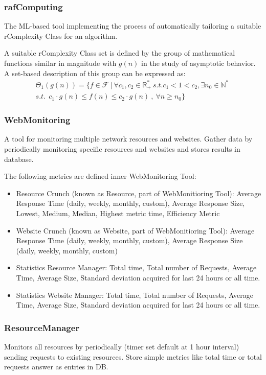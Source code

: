 \subsubsection{rafComputing}
The ML-based tool implementing the process of automatically tailoring a suitable rComplexity Class for an algorithm.


A suitable rComplexity Class set is defined by the group of mathematical functions similar in magnitude with  $g(n)$ in the study of asymptotic behavior. A set-based description of this group can be expressed as:
\[\begin{split}
      \Theta_{1}(g(n)) = \lbrace f \in \mathcal{F}\ |\ \forall c_{1}, c_{2} \in \mathbb{R}^{*}_{+} \ s.t. c_{1} < 1 < c_{2} , \exists n_{0} \in \mathbb{N}^{*}\ \\ s.t.\ \ c_{1} \cdot g(n) \leq f(n) \leq c_{2} \cdot g(n)\ ,\  \forall n \geq n_{0} \rbrace
\end{split} \]

\subsubsection{WebMonitoring}
A tool for monitoring multiple network resources and websites.
Gather data by periodically monitoring specific resources and websites and stores results in database.

The following metrics are defined inner WebMonitoring Tool:
\begin{itemize}
    \item Resource Crunch (known as Resource, part of WebMonitioring Tool): Average Response Time (daily, weekly, monthly, custom), Average Response Size, Lowest, Medium, Median, Highest metric time, Efficiency Metric
    \item Website Crunch (known as Website, part of WebMonitioring Tool): Average Response Time (daily, weekly, monthly, custom), Average Response Size (daily, weekly, monthly, custom)
    \item Statistics Resource Manager: Total time, Total number of Requests, Average Time, Average Size, Standard deviation acquired for last 24 hours or all time.
    \item Statistics Website Manager: Total time, Total number of Requests, Average Time, Average Size, Standard deviation acquired for last 24 hours or all time.
\end{itemize}

\subsubsection{ResourceManager}
Monitors all resources by periodically (timer set default at 1 hour interval) sending requests to existing resources.
Store simple metrics like total time or total requests answer as entries in DB.

